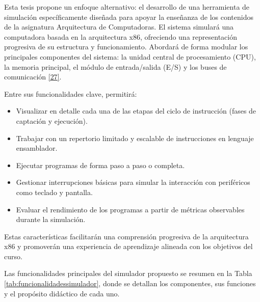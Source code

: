 \documentclass[12pt,oneside]{templates/unerthesis}
\begin{document}
Esta tesis propone un enfoque alternativo: el desarrollo de una herramienta de simulación específicamente diseñada para apoyar la enseñanza de los contenidos de la asignatura Arquitectura de Computadoras. El sistema simulará una computadora basada en la arquitectura x86, ofreciendo una representación progresiva de su estructura y funcionamiento. Abordará de forma modular los principales componentes del sistema: la unidad central de procesamiento (CPU), la memoria principal, el módulo de entrada/salida (E/S) y los buses de comunicación \protect\hyperlink{ref-ambrose2010learning}{{[}27{]}}.

Entre sus funcionalidades clave, permitirá:

\begin{itemize}
\item
  Visualizar en detalle cada una de las etapas del ciclo de instrucción (fases de captación y ejecución).
\item
  Trabajar con un repertorio limitado y escalable de instrucciones en lenguaje ensamblador.
\item
  Ejecutar programas de forma paso a paso o completa.
\item
  Gestionar interrupciones básicas para simular la interacción con periféricos como teclado y pantalla.
\item
  Evaluar el rendimiento de los programas a partir de métricas observables durante la simulación.
\end{itemize}

Estas características facilitarán una comprensión progresiva de la arquitectura x86 y promoverán una experiencia de aprendizaje alineada con los objetivos del curso.

Las funcionalidades principales del simulador propuesto se resumen en la Tabla \ref{tab:funcionalidadessimulador}, donde se detallan los componentes, sus funciones y el propósito didáctico de cada uno.
\end{document}
